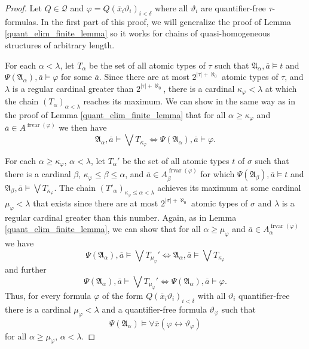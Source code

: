 \documentclass{ndjflart}
\theoremstyle{plain}
\theoremstyle{definition}
\numberwithin{equation}{section}
\DeclareMathOperator{\frvar}{frvar}
\begin{document}
\begin{proof}
Let $Q \in \mathcal{Q}$ and $\varphi = Q(\overline{x}_i\vartheta_i)_{i<\delta}$
where all $\vartheta_i$ are quantifier-free $\tau$-formulas.
In the first part of this proof, we will generalize the proof of Lemma
\ref{quant_elim_finite_lemma} so it works for chains of quasi-homogeneous
structures of arbitrary length.

For each $\alpha < \lambda$, let $T_{\alpha}$ be the set of all atomic
types of $\tau$ such that $\mathfrak{A}_{\alpha}, \overline{a} \vDash t$
and $\Psi(\mathfrak{A}_{\alpha}), \overline{a} \vDash \varphi$
for some $\overline{a}$.
Since there are at most $2^{|\tau|+\aleph_0}$ atomic types of $\tau$,
and $\lambda$ is a regular cardinal greater than $2^{|\tau|+\aleph_0}$,
there is a cardinal $\kappa_{\varphi} < \lambda$ at which the chain
$(T_{\alpha})_{\alpha < \lambda}$ reaches its maximum.
We can show in the same way as in the proof of
Lemma \ref{quant_elim_finite_lemma} that for all
$\alpha \geq \kappa_{\varphi}$ and
$\overline{a} \in A^{\frvar(\varphi)}$ we then have
\[
	\mathfrak{A}_{\alpha}, \overline{a} \vDash \bigvee T_{\kappa_{\varphi}}
	\Leftrightarrow
	\Psi(\mathfrak{A}_{\alpha}), \overline{a} \vDash \varphi.
\]

For each $\alpha \geq \kappa_{\varphi}$, $\alpha < \lambda$, let $T_{\alpha}'$
be the set of all atomic types $t$ of $\sigma$ such that there is a cardinal
$\beta$, $\kappa_{\varphi} \leq \beta \leq \alpha$, and
$\overline{a} \in A^{\frvar(\varphi)}_{\beta}$
for which
$\Psi(\mathfrak{A}_{\beta}), \overline{a} \vDash t$ and
$\mathfrak{A}_{\beta}, \overline{a} \vDash \bigvee T_{\kappa_{\varphi}}$.
The chain $(T'_{\alpha})_{\kappa_{\varphi} \leq \alpha < \lambda}$ achieves
its maximum at some cardinal $\mu_{\varphi} < \lambda$ that exists since
there are at most $2^{|\sigma| + \aleph_0}$ atomic types of $\sigma$
and $\lambda$ is a regular cardinal greater than this number.
Again, as in Lemma \ref{quant_elim_finite_lemma}, we can show that for all
$\alpha \geq \mu_{\varphi}$ and
$\overline{a} \in A^{\frvar(\varphi)}_{\alpha}$ we have
\[
	\Psi(\mathfrak{A}_{\alpha}), \overline{a} \vDash \bigvee T_{\mu_{\varphi}}'
	\Leftrightarrow \mathfrak{A}_{\alpha}, \overline{a} \vDash \bigvee T_{\kappa_{\varphi}}
\]
and further
\[
	\Psi(\mathfrak{A}_{\alpha}), \overline{a} \vDash \bigvee T_{\mu_{\varphi}}'
	\Leftrightarrow \Psi(\mathfrak{A}_{\alpha}), \overline{a} \vDash \varphi.
\]
Thus, for every formula $\varphi$ of the form
$Q(\overline{x}_i \vartheta_i)_{i < \delta}$ with all $\vartheta_i$
quantifier-free there is a cardinal $\mu_{\varphi} < \lambda$ and a
quantifier-free formula $\vartheta_{\varphi}$ such that
\[
	\Psi(\mathfrak{A}_{\alpha}) \vDash
	\forall \overline{x}(\varphi \leftrightarrow \vartheta_{\varphi})
\]
for all $\alpha \geq \mu_{\varphi}$, $\alpha < \lambda$.


\end{proof}
\end{document}
